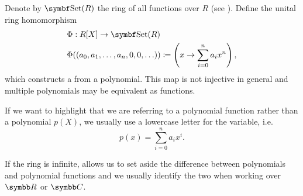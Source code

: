 \begin{definition}\label{def:polynomial_function}
  Denote by \( \Cat{Set}(R) \) the ring of all functions over \( R \) (see ). Define the unital ring homomorphism
  \begin{align*}
    &\Phi: R[X] \to \Cat{Set}(R) \\
    &\Phi((a_0, a_1, \ldots, a_n, 0, 0, \ldots)) \coloneqq \left( x \to \sum_{i=0}^n a_i x^n \right),
  \end{align*}
  which constructs a  from a polynomial. This map is not injective in general and multiple polynomials may be equivalent as functions.

  If we want to highlight that we are referring to a polynomial function rather than a polynomial \( p(X) \), we usually use a lowercase letter for the variable, i.e.
  \begin{equation*}
    p(x) = \sum_{i=0}^n a_i x^i.
  \end{equation*}

  If the ring is infinite,  allows us to set aside the difference between polynomials and polynomial functions and we usually identify the two when working over \( \BR \) or \( \BC \).
\end{definition}
